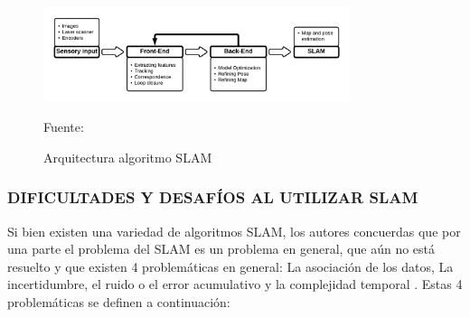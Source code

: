 \begin{figure}[h]
    \centering
    \includegraphics[width=0.8\textwidth]{figures/02marco_conceptual/arquitectura_slam.png}
    \caption{\label{fig:arquitectura_slam} Arquitectura algoritmo SLAM} 
    Fuente: \cite{taheri_slam_2021}
\end{figure}

\subsubsection{DIFICULTADES Y DESAFÍOS AL UTILIZAR SLAM}

Si bien existen una variedad de algoritmos SLAM, los autores concuerdas que por una parte el problema del SLAM es un problema en general, que aún no está resuelto y que existen 4 problemáticas en general: La asociación de los datos, La incertidumbre, el ruido o el error acumulativo y la complejidad temporal \cite{7482163}. Estas 4 problemáticas se definen a continuación: 

